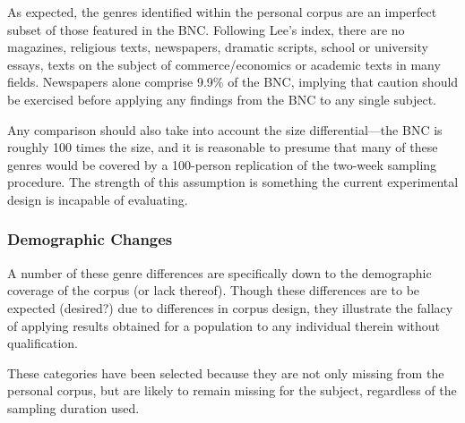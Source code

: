 As expected, the genres identified within the personal corpus are an imperfect subset of those featured in the BNC.  Following Lee's index, there are no magazines, religious texts, newspapers, dramatic scripts, school or university essays, texts on the subject of commerce/economics or academic texts in many fields.  Newspapers alone comprise 9.9\% of the BNC, implying that caution should be exercised before applying any findings from the BNC to any single subject. %

Any comparison should also take into account the size differential---the BNC is roughly 100 times the size, and it is reasonable to presume that many of these genres would be covered by a 100-person replication of the two-week sampling procedure.  The strength of this assumption is something the current experimental design is incapable of evaluating.













\subsubsection{Demographic Changes}
A number of these genre differences are specifically down to the demographic coverage of the corpus (or lack thereof).  Though these differences are to be expected (desired?) due to differences in corpus design, they illustrate the fallacy of applying results obtained for a population to any individual therein without qualification.

These categories have been selected because they are not only missing from the personal corpus, but are likely to remain missing for the subject, regardless of the sampling duration used.

